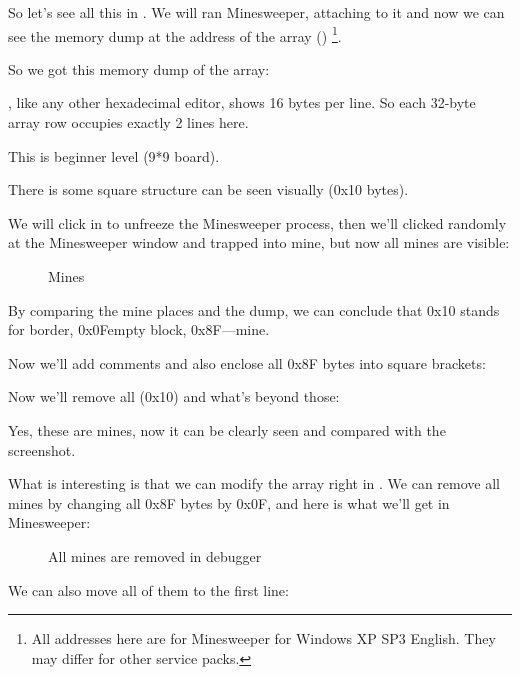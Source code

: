 So let's see all this in \olly.
We will ran Minesweeper, attaching \olly to it and now we can see the memory dump at the address of the  array ()
\footnote{All addresses here are for Minesweeper for Windows XP SP3 English. 
They may differ for other service packs.}.

So we got this memory dump of the array:



\olly, like any other hexadecimal editor, shows 16 bytes per line.
So each 32-byte array row occupies exactly 2 lines here.

This is beginner level (9*9 board).

There is some square 
structure can be seen visually (0x10 bytes).

We will click  in \olly to unfreeze the Minesweeper process, then we'll clicked randomly at the Minesweeper window 
and trapped into mine, but now all mines are visible:

\begin{figure}[H]
\centering
{}
\caption{Mines}
\label{fig:minesweeper1}
\end{figure}

By comparing the mine places and the dump, we can conclude that 0x10 stands for border, 0x0F\EMDASH{}empty block, 0x8F---mine.

Now we'll add comments and also enclose all 0x8F bytes into square brackets:



Now we'll remove all  (0x10) and what's beyond those:



Yes, these are mines, now it can be clearly seen and compared with the screenshot.

\clearpage
What is interesting is that we can modify the array right in \olly.
We can remove all mines by changing all 0x8F bytes by 0x0F, and here is what we'll get in Minesweeper:

\begin{figure}[H]
\centering
{}
\caption{All mines are removed in debugger}
\label{fig:minesweeper3}
\end{figure}

We can also move all of them to the first line: 

